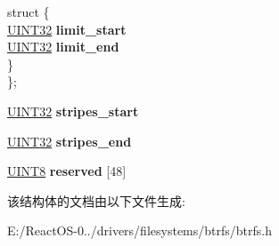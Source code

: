 \begin{DoxyCompactItemize}
\begin{tabbing}
\mbox{\label{union_b_a_l_a_n_c_e___a_r_g_s_1_1_0D570_a7fdcb46845c4ba6261c0d96dd711663a}} 
\>struct \{\\
\>\>\hyperlink{_processor_bind_8h_ae1e6edbbc26d6fbc71a90190d0266018}{UINT32} {\bfseries limit\_start}\\
\>\>\hyperlink{_processor_bind_8h_ae1e6edbbc26d6fbc71a90190d0266018}{UINT32} {\bfseries limit\_end}\\
\>\} \\
\}; \\

\end{tabbing}\item 
\mbox{\label{struct_b_a_l_a_n_c_e___a_r_g_s_aa83b478182855093989c90ea9051a174}} 
\hyperlink{_processor_bind_8h_ae1e6edbbc26d6fbc71a90190d0266018}{U\+I\+N\+T32} {\bfseries stripes\+\_\+start}
\item 
\mbox{\label{struct_b_a_l_a_n_c_e___a_r_g_s_a256900f26c13d252bc9595e2900e36e2}} 
\hyperlink{_processor_bind_8h_ae1e6edbbc26d6fbc71a90190d0266018}{U\+I\+N\+T32} {\bfseries stripes\+\_\+end}
\item 
\mbox{\label{struct_b_a_l_a_n_c_e___a_r_g_s_abe529a63383ff999560d5d5a03cdffdb}} 
\hyperlink{_processor_bind_8h_ab27e9918b538ce9d8ca692479b375b6a}{U\+I\+N\+T8} {\bfseries reserved} \mbox{[}48\mbox{]}
\end{DoxyCompactItemize}


该结构体的文档由以下文件生成\+:\begin{DoxyCompactItemize}
\item 
E\+:/\+React\+O\+S-\/0../drivers/filesystems/btrfs/btrfs.\+h\end{DoxyCompactItemize}
